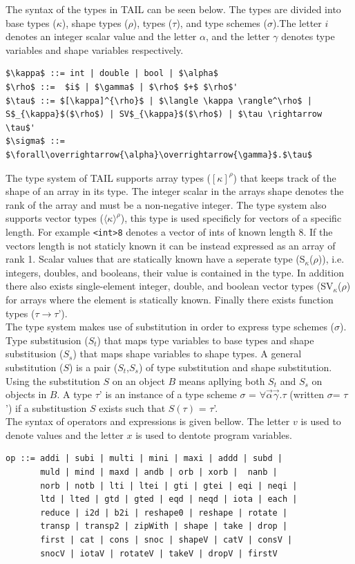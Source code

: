 \documentclass[11pt]{article}
\begin{document}
The syntax of the types in TAIL can be seen below. The types are divided into base types ($\kappa$), shape types ($\rho$), types ($\tau$), and type schemes ($\sigma$).The letter $i$ denotes an integer scalar value and the letter $\alpha$, and the letter $\gamma$ denotes type variables and shape variables respectively.
\begin{lstlisting}[numbers=none,frame=none]
$\kappa$ ::= int | double | bool | $\alpha$
$\rho$ ::=  $i$ | $\gamma$ | $\rho$ $+$ $\rho$'
$\tau$ ::= $[\kappa]^{\rho}$ | $\langle \kappa \rangle^\rho$ | S$_{\kappa}$($\rho$) | SV$_{\kappa}$($\rho$) | $\tau \rightarrow \tau$'
$\sigma$ ::= $\forall\overrightarrow{\alpha}\overrightarrow{\gamma}$.$\tau$
\end{lstlisting}
The type system of TAIL supports array types ($[\kappa]^{\rho}$) that keeps track of the shape of an array in its type.
The integer scalar in the arrays shape denotes the rank of the array and must be a non-negative integer.
The type system also supports vector types ($\langle \kappa \rangle^\rho$), this type is used specificly for vectors of a specific length. For example {\tt <int>8} denotes a vector of ints of known length 8. If the vectors length is not staticly known it can be instead expressed as an array of rank 1.
Scalar values that are statically known have a seperate type (S$_{\kappa}$($\rho$)), i.e. integers, doubles, and booleans, their value is contained in the type.
In addition there also exists single-element integer, double, and boolean vector types (SV$_{\kappa}$($\rho$) for arrays where the element is statically known.
Finally there exists function types ($\tau \rightarrow \tau$'). \\

The type system makes use of substitution in order to express type schemes ($\sigma$). Type substitusion ($S_t$) that maps type variables to base types and shape substitusion ($S_s$) that maps shape variables to shape types. A general substitution ($S$) is a pair ($S_t$,$S_s$) of type substitution and shape substitution. Using the substitution $S$ on an object $B$ means apllying 
both $S_t$ and $S_s$ on objects in $B$. A type $\tau$' is an instance of a type scheme $\sigma$ = $\forall\overrightarrow{\alpha}\overrightarrow{\gamma}$.$\tau$ (written $\sigma$= $\tau$') if a substitustion $S$ exists such that $S(\tau)$ = $\tau$'. \\

The syntax of operators and expressions is given bellow. The letter $v$ is used to denote values and the letter $x$ is used to dentote program variables. 
\begin{lstlisting}[numbers=none,frame=none]
op ::= addi | subi | multi | mini | maxi | addd | subd | 
       muld | mind | maxd | andb | orb | xorb |  nanb | 
       norb | notb | lti | ltei | gti | gtei | eqi | neqi |
       ltd | lted | gtd | gted | eqd | neqd | iota | each |
       reduce | i2d | b2i | reshape0 | reshape | rotate |
       transp | transp2 | zipWith | shape | take | drop |
       first | cat | cons | snoc | shapeV | catV | consV | 
       snocV | iotaV | rotateV | takeV | dropV | firstV 
\end{lstlisting}
\end{document}
